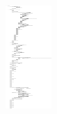 \documentclass[nobib, nohyper, a4paper,openany]{tufte-book}
\begin{document}
\begin{figure}
  \centering
  \begin{subfigure}[b]{0.3\textwidth}
    \includegraphics[width=\textwidth]{figures/treegraphs/midcount.png}

\end{subfigure}
\end{figure}
\end{document}
